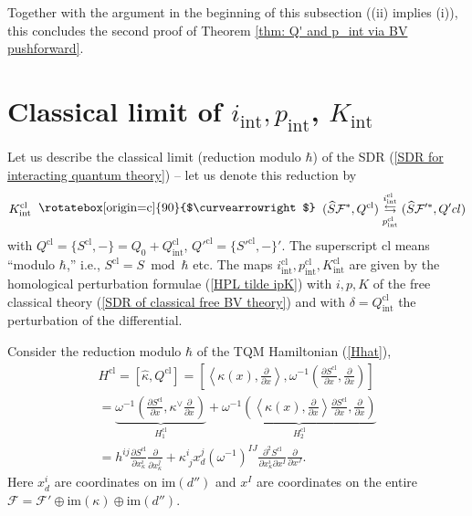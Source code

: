 \documentclass{amsart}
\theoremstyle{plain} %
\theoremstyle{definition}
\theoremstyle{remark}
\newcommand{\mr}{\mathrm}
\newcommand{\ra}{\rightarrow}
\newcommand{\wh}{\widehat}
\newcommand{\F}{\mathcal{F}}
\newcommand{\dd}{\partial}
\newcommand{\ii}{\mathrm{int}}
\newcommand{\SDR}[5]{#5\;\;\raisebox{1.3pt}{\rotatebox[origin=c]{90}{$\curvearrowright$}}\;\; #1 \underset{#4}{\stackrel{#3}{\leftrightarrows}} #2}  %
\newcommand{\cl}{\mathrm{cl}}
\begin{document}
Together with the argument in the beginning of this subsection ((ii) implies (i)), this concludes the second proof of Theorem \ref{thm: Q' and p_int via BV pushforward}.


\section{Classical limit of $i_\ii,p_\ii$, $K_\ii$}
\label{sec: classical limit of i_int, p_int, K_int}

Let us describe the classical limit (reduction modulo $\hbar$) of the SDR (\ref{SDR for interacting quantum theory}) -- let us denote this reduction by
\begin{equation}\label{SDR for classical interacting theory}
    \SDR{(\wh{S}\F^*,Q^\cl)}{(\wh{S}\F'^*,Q'^\cl)}{i_\ii^\cl}{p_\ii^\cl}{K_\ii^\cl}
\end{equation}
with $Q^\cl=\{S^\cl,-\}=Q_0+Q^\cl_\ii$,  $Q'^\cl=\{S'^\cl,-\}'$. The superscript $\cl$ means ``modulo $\hbar$,'' i.e., $S^\cl=S\bmod\hbar$ etc.
The maps $i^\cl_\ii, p^\cl_\ii,K^\cl_\ii$ are given by the homological perturbation formulae (\ref{HPL tilde ipK}) with $i,p,K$ of the free classical theory (\ref{SDR of classical free BV theory}) and with  $\delta=Q_\ii^\cl$ the perturbation of the differential.

Consider the reduction modulo $\hbar$ of the TQM Hamiltonian (\ref{Hhat}),
\begin{multline}\label{Hhat classical}
    H^\cl=[\wh\kappa, Q^\cl]= \left[ \left\langle\kappa(x),\frac{\dd}{\dd x} \right\rangle, \omega^{-1}\left(\frac{\dd S^\cl}{\dd x},\frac{\dd}{\dd x}\right)\right]
    \\
    = \underbrace{\omega^{-1}\left(\frac{\dd S^\cl}{\dd x},\kappa^\vee \frac{\dd }{\dd x}\right)}_{H^\cl_1} + \underbrace{\omega^{-1}\left(\left\langle\kappa(x),\frac{\dd}{\dd x} \right\rangle \frac{\dd S^\cl}{\dd x},\frac{\dd}{\dd x} \right)}_{H^\cl_2}
    \\
    = h^{ij}\frac{\dd S^\cl}{\dd x^i_\kappa}\frac{\dd}{\dd x^j_\kappa}+\kappa^i_{\; j} x^j_d (\omega^{-1})^{IJ}\frac{\dd^2 S^\cl}{\dd x^i_\kappa\dd x^I}\frac{\dd}{\dd x^J}.
\end{multline}
Here $x^i_d$ are coordinates on $\mr{im}(d'')$ and $x^I$ are coordinates on the entire $\F=\F'\oplus \mr{im}(\kappa)\oplus \mr{im} (d'')$.
\end{document}
